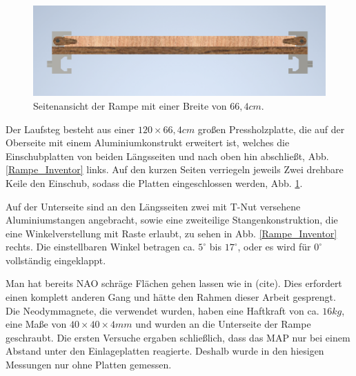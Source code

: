 \begin{figure}
	\vspace{-0.5cm}
	\centering
	\includegraphics[width=\linewidth]{Bilder/Rampe_Seitenansicht3.png}
	\caption{Seitenansicht der Rampe mit einer Breite von $66,4 \unit{cm}$.}
	\label{Rampe_Seite_Inventor}
	\vspace{-0.5cm}
\end{figure}
Der Laufsteg besteht aus einer $120\times66,4 \unit{cm}$ großen Pressholzplatte, die auf der Oberseite mit einem Aluminiumkonstrukt erweitert ist, welches die Einschubplatten von beiden Längsseiten und nach oben hin abschließt, Abb. \ref{Rampe_Inventor} links. Auf den kurzen Seiten verriegeln jeweils Zwei drehbare Keile den Einschub, sodass die Platten eingeschlossen werden, Abb. \ref{Rampe_Seite_Inventor}.

Auf der Unterseite sind an den Längsseiten zwei mit T-Nut versehene Aluminiumstangen angebracht, sowie eine zweiteilige Stangenkonstruktion, die eine Winkelverstellung mit Raste erlaubt, zu sehen in Abb. \ref{Rampe_Inventor} rechts. Die einstellbaren Winkel betragen ca. $5^\circ$ bis $17^\circ$, oder es wird für $0^\circ$ vollständig eingeklappt.
  

Man hat bereits NAO schräge Flächen gehen lassen wie in (cite). Dies erfordert einen komplett anderen Gang und hätte den Rahmen dieser Arbeit gesprengt. Die Neodymmagnete, die verwendet wurden, haben eine Haftkraft von ca. $16 \unit{kg}$, eine Maße von $40\times40\times4 \unit{mm}$ \cite{schraubmagnet} und wurden an die Unterseite der Rampe geschraubt. Die ersten Versuche ergaben schließlich, dass das MAP nur bei einem Abstand unter den Einlageplatten reagierte. Deshalb wurde in den hiesigen Messungen nur ohne Platten gemessen.




